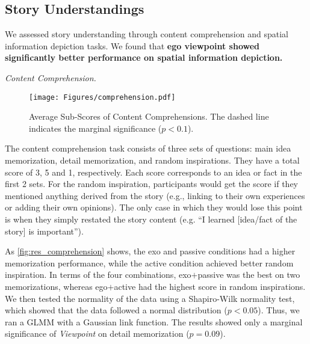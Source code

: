 \subsection{Story Understandings}
We assessed story understanding through content comprehension and spatial information depiction tasks. 
{We found that \textbf{ego viewpoint showed significantly better performance on spatial information depiction.}}

\textit{Content Comprehension.}
\begin{figure*}[h]
\centering
  \texttt{[image: Figures/comprehension.pdf]}
  \caption{Average Sub-Scores of Content Comprehensions. The dashed line indicates the marginal significance ($p < 0.1$).}
  \label{fig:res_comprehension}
\end{figure*}
The content comprehension task consists of three sets of questions: main idea memorization, detail memorization, and random inspirations. They have a total score of 3, 5 and 1, respectively. Each score corresponds to an idea or fact in the first 2 sets. For the random inspiration, participants would get the score if they mentioned anything derived from the story (e.g., linking to their own experiences or adding their own opinions). The only case in which they would lose this point is when they simply restated the story content (e.g. ``I learned [idea/fact of the story] is important'').

As \autoref{fig:res_comprehension} shows, the exo and passive conditions had a higher memorization performance, while the active condition achieved better random inspiration. In terms of the four combinations, exo$+$passive was the best on two memorizations, whereas ego$+$active had the highest score in random inspirations.
We then tested the normality of the data using a Shapiro-Wilk normality test, which showed that the data followed a normal distribution ($p < 0.05$).
Thus, we ran a GLMM with a Gaussian link function.
The results showed only a marginal significance of \textit{Viewpoint} on detail memorization ($p = 0.09$).

